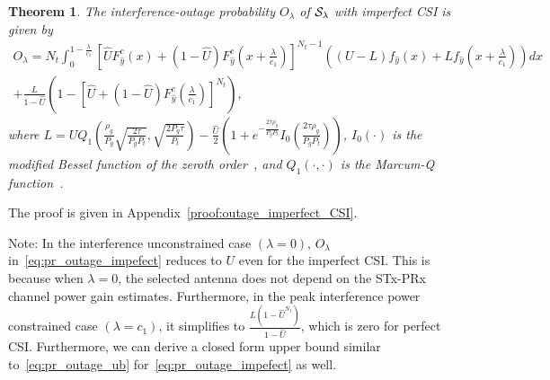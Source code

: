 \documentclass[12pt,draftcls,peerreview,onecolumn]{IEEEtran}
\newtheorem{theorem}{{\bf Theorem}}
\newcommand{\lam}{\lambda}
\newcommand{\Nt}{{N_t}}
\newcommand{\Nr}{{N_r}}
\newcommand{\Pt}{{P_t}}
\newcommand{\itau}{\tau}
\newcommand{\cone}{c_{1}}
\newcommand{\ctwo}{c_{2}}
\newcommand{\out}{O}
\newcommand{\m}{\cone}
\newcommand{\lambym}{\frac{\lam}{\m}}
\newcommand{\al}{\ctwo}
\newcommand{\snr}{\Omega}
\newcommand{\un}{U}
\newcommand{\callamrule}{{\cal S_{{\lam}}}}
\newcommand{\outlam}{\out_{\lam}}
\newcommand{\unhat}{\widehat{\un}}
\newcommand{\snrhat}{\widehat{\snr}}
\newcommand{\gpilotpower}{P_g}
\newcommand{\yhat}{\hat{y}}
\newcommand{\Probglt}{L}
\newcommand{\albysnrhat}[1][]{\frac{\al#1}{\snrhat}}
\newcommand{\rhog}{\rho_g}
\begin{document}
\begin{theorem}
\label{thm:outage_imperfect_CSI}
  The interference-outage probability $\outlam$ of $\callamrule$ with imperfect CSI is given by
\begin{multline}
\label{eq:pr_outage_impefect} 
\!\outlam \!=\! \Nt \!\int_{0}^{1-\lambym} 	
\!\left[ \unhat F_{\yhat}^{c}\left(x\right) + \left(1 -\unhat\right)F_{\yhat}^{c}\left(x+\lambym\right)\right]^{\Nt-1}\!\! \left(\! (\un - \Probglt) f_{\yhat}\left(x\right)  \!+\!  \Probglt f_{\yhat}\!\left(\! x+\lambym\right) \!\right) dx\\
+ \frac{ \Probglt}{1 - \unhat} \left( 1 - \left[\unhat + \left(1 -\unhat\right)F_{\yhat}^{c}\left(\lambym\right)  \right]^{\Nt}  \right) ,
\end{multline}
%
%
where $\Probglt \!=\! \un  Q_1\!\left(\frac{\rhog}{ \gpilotpower} \sqrt{\frac{2\itau}{ \gpilotpower\Pt}},\sqrt{\frac{2 \gpilotpower\itau}{\Pt}}\right) \! - \frac{\unhat}{2} \left(\! 1 + e^{-\frac{2\itau\rhog}{ \gpilotpower\Pt}}I_{0}\!\left(\frac{2\itau\rhog}{ \gpilotpower\Pt} \right) \!\right)$, $I_{0}(\cdot)$ is the modified Bessel function of the zeroth order~\cite[(8.406.3)]{gradshteyn00_book}, and  $Q_1(\cdot,\cdot)$ is the Marcum-Q function~\cite[(4.34)]{simon_alouini_book}.  %
\end{theorem}
%
\begin{IEEEproof}
	The proof is given in Appendix~\ref{proof:outage_imperfect_CSI}.
\end{IEEEproof}
%

Note: In the interference unconstrained case $\left(\lam=0\right)$, $\outlam$ in~\eqref{eq:pr_outage_impefect} reduces to $\un$ even for the imperfect CSI. This is because when $\lam=0$, the selected  antenna does not depend on the  STx-PRx channel power gain estimates. Furthermore, in the peak interference power constrained case $\left(\lam=\cone\right)$, it simplifies to $\frac{ \Probglt \left( 1-\unhat^{\Nt}\right) }{1-\unhat}$, which is zero for perfect CSI. Furthermore, we can derive a closed form upper bound similar to~\eqref{eq:pr_outage_ub} for~\eqref{eq:pr_outage_impefect} as well.
\end{document}
